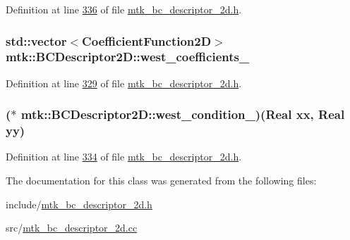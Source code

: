 Definition at line \hyperlink{mtk__bc__descriptor__2d_8h_source_l00336}{336} of file \hyperlink{mtk__bc__descriptor__2d_8h_source}{mtk\+\_\+bc\+\_\+descriptor\+\_\+2d.\+h}.

\hypertarget{classmtk_1_1BCDescriptor2D_a7df71b43acc25c468683075cc7790bb2}{
\subsubsection[{west\+\_\+coefficients\+\_\+}]{\setlength{\rightskip}{0pt plus 5cm}std\+::vector$<${\bf Coefficient\+Function2\+D}$>$ mtk\+::\+B\+C\+Descriptor2\+D\+::west\+\_\+coefficients\+\_\+\hspace{0.3cm}{\ttfamily [private]}}}\label{classmtk_1_1BCDescriptor2D_a7df71b43acc25c468683075cc7790bb2}


Definition at line \hyperlink{mtk__bc__descriptor__2d_8h_source_l00329}{329} of file \hyperlink{mtk__bc__descriptor__2d_8h_source}{mtk\+\_\+bc\+\_\+descriptor\+\_\+2d.\+h}.

\hypertarget{classmtk_1_1BCDescriptor2D_a2d4af48b3408658c7ace6eeb74464c9f}{
\subsubsection[{west\+\_\+condition\+\_\+}]{($\ast$ mtk\+::\+B\+C\+Descriptor2\+D\+::west\+\_\+condition\+\_\+)({\bf Real} xx, {\bf Real} yy)\hspace{0.3cm}{\ttfamily [private]}}}\label{classmtk_1_1BCDescriptor2D_a2d4af48b3408658c7ace6eeb74464c9f}


Definition at line \hyperlink{mtk__bc__descriptor__2d_8h_source_l00334}{334} of file \hyperlink{mtk__bc__descriptor__2d_8h_source}{mtk\+\_\+bc\+\_\+descriptor\+\_\+2d.\+h}.



The documentation for this class was generated from the following files\+:\begin{DoxyCompactItemize}
\item 
include/\hyperlink{mtk__bc__descriptor__2d_8h}{mtk\+\_\+bc\+\_\+descriptor\+\_\+2d.\+h}\item 
src/\hyperlink{mtk__bc__descriptor__2d_8cc}{mtk\+\_\+bc\+\_\+descriptor\+\_\+2d.\+cc}\end{DoxyCompactItemize}
